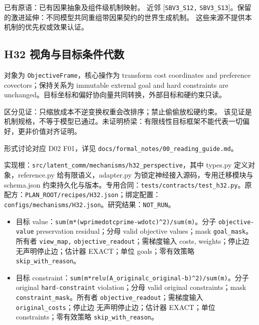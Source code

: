 \documentclass[
  10pt,
]{article}
\begin{document}
已有原语：已有因果抽象及组件级机制映射。 近邻 {[}\nolinkurl{SBV3_S12,}
\nolinkurl{SBV3_S13}{]}。保留的激进延伸：不同模型共同重组带因果契约的世界生成机制。
这些来源不提供本机制的优先权或效果认证。

\subsection{H32
视角与目标条件代数}\label{h32-ux89c6ux89d2ux4e0eux76eeux6807ux6761ux4ef6ux4ee3ux6570}

对象为 \nolinkurl{ObjectiveFrame}，核心操作为 transform cost coordinates
and preference covectors；保持关系为 immutable external goal and hard
constraints are
unchanged。目标坐标和偏好协向量共同转换，外部目标和硬约束只读。

区分见证：只缩放成本不逆变换权重会改排序；禁止偷偷放松硬约束。
该见证是机制规格，不等于模型已通过。未证明桥梁：有限线性目标框架不能代表一切偏好，更非价值对齐证明。

形式讨论对应 D02 F01，详见
{\small\nolinkurl{docs/formal_notes/00_reading_guide.md}}。

实现根：{\small\nolinkurl{src/latent_comm/mechanisms/h32_perspective}}，其中
types.py 定义对象，reference.py 给有限语义，adapter.py
为锁定神经接入源码，专用迁移模块与 schema.json
约束持久化与版本。专用合同：{\small\nolinkurl{tests/contracts/test_h32.py}}。原配方：{\small\nolinkurl{PLAN_ROOT/recipes/H32.json}}；绑定配置：{\small\nolinkurl{configs/mechanisms/H32.json}}。研究结果：\nolinkurl{NOT_RUN}。

\begin{itemize}
\item
  目标
  value：{\small\nolinkurl{sum(m*(wprime}\hspace{0.333em}\nolinkurl{dot}\hspace{0.333em}\nolinkurl{cprime-w}\hspace{0.333em}\nolinkurl{dot}\hspace{0.333em}\nolinkurl{c)^2)/sum(m)}}。分子
  \nolinkurl{objective-value} preservation residual；分母 valid
  objective values；mask \nolinkurl{goal_mask}。所有者
  \nolinkurl{view_map,} \nolinkurl{objective_readout}；需梯度输入 costs,
  weights；停止边 无声明停止边；估计器 EXACT；单位 goals；零有效策略
  \nolinkurl{skip_with_reason}。
\item
  目标
  constraint：{\small\nolinkurl{sum(m*relu(A_original}\hspace{0.333em}\nolinkurl{c_original-b)^2)/sum(m)}}。分子
  original \nolinkurl{hard-constraint} violation；分母 valid original
  constraints；mask \nolinkurl{constraint_mask}。所有者
  \nolinkurl{objective_readout}；需梯度输入
  \nolinkurl{original_costs}；停止边 无声明停止边；估计器 EXACT；单位
  constraints；零有效策略 \nolinkurl{skip_with_reason}。
\end{itemize}
\end{document}
